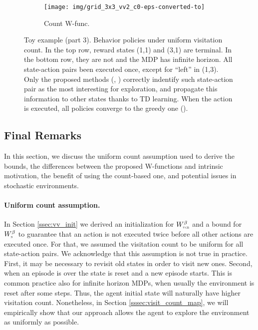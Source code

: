 \documentclass{article}
\newcommand{\textsub}[1]{\textsc{\tiny #1}} \newcommand{\func}[2]{\textsf{#1}(#2)} \newcommand{\hl}[1]{\textcolor{red}{{#1}}} \newcommand{\hll}[1]{\textcolor{blue}{{#1}}}
\begin{document}
\begin{figure}[t]
\begin{subfigure}[t]{.18\linewidth}
		\centering 
		\texttt{[image: img/grid\_3x3\_vv2\_c0-eps-converted-to]}
		\caption{\label{fig:toy_vv2_0}Count W-func.}
	\end{subfigure}
	\caption{\label{fig:toy_uniform}Toy example (part 3). Behavior policies under uniform visitation count. In the top row, reward states (1,1) and (3,1) are terminal. In the bottom row, they are not and the MDP has infinite horizon. All state-action pairs been executed once, except for ``left'' in (1,3). Only the proposed methods (, ) correctly indentify such state-action pair as the most interesting for exploration, and propagate this information to other states thanks to TD learning. When the action is executed, all policies converge to the greedy one ().}
\end{figure}

\clearpage





\subsection{Final Remarks}
\label{ssec:notes}
In this section, we discuss the uniform count assumption used to derive the bounds, the differences between the proposed W-functions and intrinsic motivation, the benefit of using the count-based one, and potential issues in stochastic environments. 

\paragraph{Uniform count assumption.}
In Section \ref{ssec:vv_init} we derived an initialization for $W^\beta_{\textsub{ucb}}$ and a bound for $W^\beta_{\textsub{n}}$ to guarantee that an action is not executed twice before all other actions are executed once. For that, we assumed the visitation count to be uniform for all state-action pairs. 
We acknowledge that this assumption is not true in practice. First, it may be necessary to revisit old states in order to visit new ones. Second, when an episode is over the state is reset and a new episode starts. 
This is common practice also for infinite horizon MDPs, when usually the environment is reset after some steps.
Thus, the agent initial state will naturally have higher visitation count. Nonetheless, in Section \ref{sssec:visit_count_map}, we will empirically show that our approach allows the agent to explore the environment as uniformly as possible.
\end{document}
